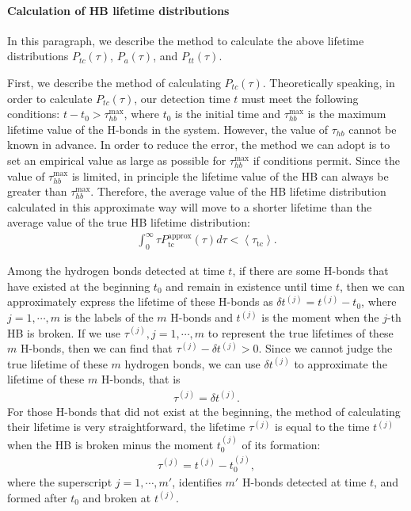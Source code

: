 {\paragraph{Calculation of HB lifetime distributions}
In this paragraph, we describe the method to calculate the above lifetime distributions $P_{tc}(\tau)$, $P_{a}(\tau)$, and $P_{tt}(\tau)$.

First, we describe the method of calculating $P_{tc}(\tau)$.
Theoretically speaking, in order to calculate $P_{tc}(\tau)$, our detection time $t$ must meet the following conditions: 
$t-t_0 > \tau_{hb}^{\max}$, where $t_0$ is the initial time and $\tau_{hb}^{\max}$ is the maximum lifetime value of the H-bonds in the system. 
However, the value of $\tau_{hb}$ cannot be known in advance. 
In order to reduce the error, the method we can adopt is to set an empirical value as large as possible for
 $\tau_{hb}^{\max}$ if conditions permit. Since the value of $\tau_{hb}^{\max}$ is limited, in principle the lifetime value of the HB 
can always be greater than $\tau_{hb}^{\max}$. 
Therefore, the average value of the HB lifetime distribution 
calculated in this approximate way will move to a shorter lifetime than the average value of the true HB lifetime distribution:
\begin{eqnarray}
\int_{0}^{\infty} \tau P_{\mathrm{tc}}^{\mathrm{approx}}(\tau) d \tau < \left\langle\tau_{\mathrm{tc}}\right\rangle.
\label{eq:upper_bound_1_for_tau_tc}
\end{eqnarray} 

Among the hydrogen bonds detected at time $t$, if there are some H-bonds that have existed at the beginning $t_0$ and 
remain in existence until time $t$, then we can approximately express the lifetime of these H-bonds as $\delta t^{(j)}=t^{(j)} -t_0$, 
where $j=1,\cdots, m$ is the labels of the $m$ H-bonds and $t^{(j)}$ is the moment when the $j$-th HB is broken. 
If we use $\tau^{(j)},j=1,\cdots,m$ to represent the true lifetimes of these $m$ H-bonds,
then we can find that $\tau^{(j)}-\delta t^{(j)} >0 $.
Since we cannot judge the true lifetime of these $m$ hydrogen bonds, we can use $\delta t^{(j)}$ to approximate 
the lifetime of these $m$ H-bonds, that is
\begin{eqnarray}
\tau^{(j)} = \delta t^{(j)}.
\end{eqnarray}
For those H-bonds that did not exist at the beginning, the method of calculating their lifetime is very straightforward, 
the lifetime $\tau^{(j)}$ is equal to the time $t^{(j)}$ when the HB is broken minus the moment $t^{{(j)}}_0$ of its formation:
\begin{eqnarray}
\tau^{(j)} = t^{(j)} - t^{(j)}_0,
\end{eqnarray} 
where the superscript $j = 1, \cdots, m'$, identifies $m'$ H-bonds 
detected at time $t$, and
formed after $t_0$ and broken at $t^{(j)}$.

}
